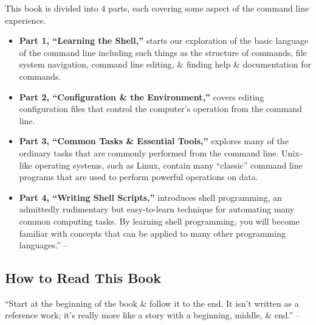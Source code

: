 \documentclass[oneside]{book}
\numberwithin{equation}{section}
\begin{document}
This book is divided into 4 parts, each covering some aspect of the command line experience.
\begin{itemize}
	\item \textbf{Part 1, ``Learning the Shell,''} starts our exploration of the basic language of the command line including such things as the structure of commands, file system navigation, command line editing, \& finding help \& documentation for commands.
	\item \textbf{Part 2, ``Configuration \& the Environment,''} covers editing configuration files that control the computer's operation from the command line.
	\item \textbf{Part 3, ``Common Tasks \& Essential Tools,''} explores many of the ordinary tasks that are commonly performed from the command line. Unix-like operating systems, such as Linux, contain many ``classic'' command line programs that are used to perform powerful operations on data.
	\item \textbf{Part 4, ``Writing Shell Scripts,''} introduces shell programming, an admittedly rudimentary but easy-to-learn technique for automating many common computing tasks. By learning shell programming, you will become familiar with concepts that can be applied to many other programming languages.'' -- \cite[pp. 33--34]{Shotts2019}
\end{itemize}

\subsection*{How to Read This Book}
``Start at the beginning of the book \& follow it to the end. It isn't written as a reference work; it's really more like a story with a beginning, middle, \& end.'' -- \cite[p. 34]{Shotts2019}
\end{document}
